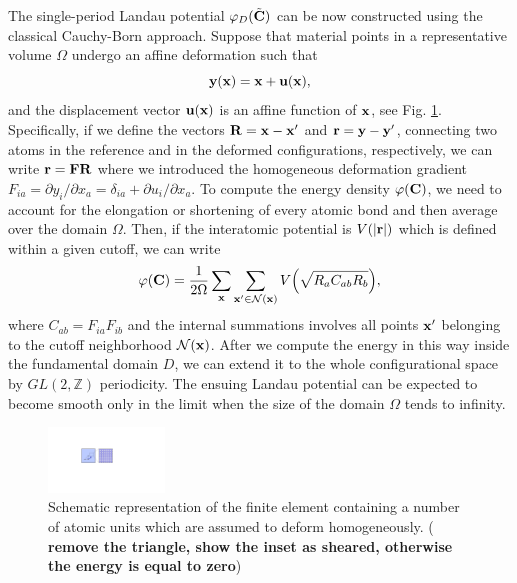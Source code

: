 \documentclass[aps,
superscriptaddress,notitlepage]{revtex4-1}
\def\phi{\varphi}
\begin{document}
  
The single-period Landau potential $\phi_D(\tilde{\bf C})$ can be now constructed using the classical Cauchy-Born approach. Suppose   that material points in a representative volume $\Omega $ undergo an affine deformation  such that \begin{equation}
{\bf y}({\bf x}) = {\bf x} + {\bf u}({\bf x}),
\end{equation}
and the displacement vector  ${\bf u}({\bf x})$ is an affine function of $\bf x$, see Fig. \ref{fig:09}. Specifically, if we  define the vectors ${\bf R} = {\bf x} - {\bf x}' $ and ${\bf r} = {\bf y} - {\bf y}'$, connecting two atoms   in the reference  and in the deformed configurations, respectively,  we can write ${\bf r} = {\bf F} {\bf R}$ where we introduced the homogeneous  deformation gradient  $ F_{ia} = \partial y_i/\partial x_a = \delta_{ia} + \partial u_i/\partial x_a$. To compute the energy density $\phi(\bf C)$, we need to account for the elongation or shortening of   every  atomic bond and then average over the domain $\Omega $. Then, if the interatomic potential is $V(|{\bf r}|)$ which is defined within a given  cutoff,  
 we can write
\begin{equation}
\label{eqn:cg_sum}
\phi( {\bf C}) = \frac{1}{2\Omega }\sum_{{\bf x}} \sum_{{\bf x}'\in\mathcal{N}({\bf x})} V \Bigl( \sqrt{R_a C_{ab} R_b} \Bigr),
\end{equation}
where $C_{ab}=F_{ia}F_{ib}$ and the internal summations involves all points ${\bf x}'$ belonging to the cutoff neighborhood $\mathcal{N}({\bf x})$. After we compute the energy in this way inside the fundamental domain   $D$, we can extend it to the whole configurational space by $GL(2, \mathbb{Z})$ periodicity. The ensuing Landau potential can be expected to become smooth only in the limit when the size of the domain $\Omega $ tends to infinity.


\begin{figure}[h!]
\includegraphics[width=0.275\textwidth]{figures_ordering/figure_04.pdf}
\caption{ Schematic representation of the finite element containing a number of atomic units which are assumed to deform homogeneously. ( \textbf{remove the triangle, show the inset as sheared, otherwise the energy is equal to zero})  } 
\label{fig:09}
\end{figure}
\end{document}
